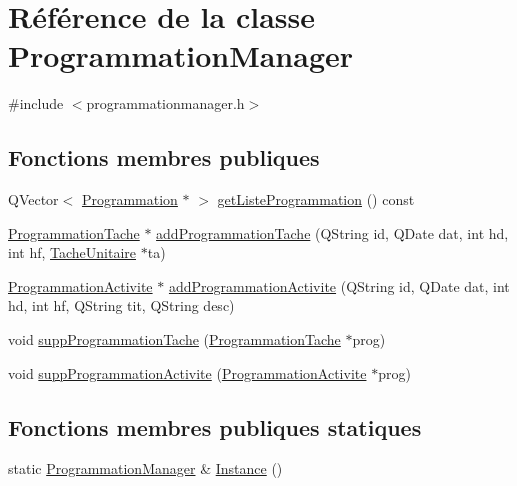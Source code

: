 \hypertarget{class_programmation_manager}{}\section{Référence de la classe Programmation\+Manager}
\label{class_programmation_manager}


{\ttfamily \#include $<$programmationmanager.\+h$>$}

\subsection*{Fonctions membres publiques}
\begin{DoxyCompactItemize}
\item 
Q\+Vector$<$ \hyperlink{class_programmation}{Programmation} $\ast$ $>$ \hyperlink{class_programmation_manager_a05398cf87cb227b0e2e9fbf93b36af80}{get\+Liste\+Programmation} () const 
\item 
\hyperlink{class_programmation_tache}{Programmation\+Tache} $\ast$ \hyperlink{class_programmation_manager_a286ba93621f944ed4e3d52a6c32b9f46}{add\+Programmation\+Tache} (Q\+String id, Q\+Date dat, int hd, int hf, \hyperlink{class_tache_unitaire}{Tache\+Unitaire} $\ast$ta)
\item 
\hyperlink{class_programmation_activite}{Programmation\+Activite} $\ast$ \hyperlink{class_programmation_manager_afcead9271094c4b839a750527406c366}{add\+Programmation\+Activite} (Q\+String id, Q\+Date dat, int hd, int hf, Q\+String tit, Q\+String desc)
\item 
void \hyperlink{class_programmation_manager_af3c39775fa3ea5a8642181dbed0a519c}{supp\+Programmation\+Tache} (\hyperlink{class_programmation_tache}{Programmation\+Tache} $\ast$prog)
\item 
void \hyperlink{class_programmation_manager_a2781cb1d7ae670b5b779cbe76f7714a6}{supp\+Programmation\+Activite} (\hyperlink{class_programmation_activite}{Programmation\+Activite} $\ast$prog)
\end{DoxyCompactItemize}
\subsection*{Fonctions membres publiques statiques}
\begin{DoxyCompactItemize}
\item 
static \hyperlink{class_programmation_manager}{Programmation\+Manager} \& \hyperlink{class_programmation_manager_a8b2d81872d9d34cc33e0a0b348875550}{Instance} ()
\end{DoxyCompactItemize}

